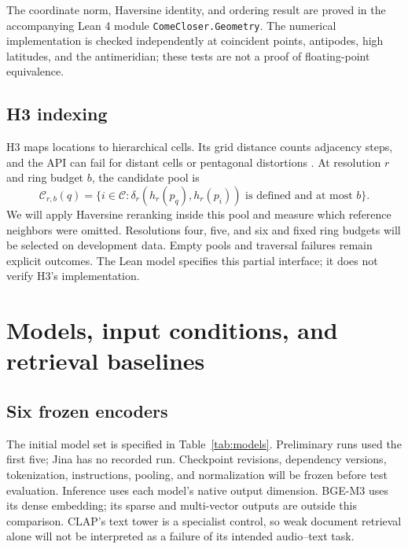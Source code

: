 \documentclass[10pt]{article}
\begin{document}
The coordinate norm, Haversine identity, and ordering result are proved in the accompanying Lean 4 module \texttt{ComeCloser.Geometry}. The numerical implementation is checked independently at coincident points, antipodes, high latitudes, and the antimeridian; these tests are not a proof of floating-point equivalence.

\subsection{H3 indexing}
H3 maps locations to hierarchical cells. Its grid distance counts adjacency steps, and the API can fail for distant cells or pentagonal distortions \citep{h3docs}. At resolution $r$ and ring budget $b$, the candidate pool is
\begin{equation}
\mathcal C_{r,b}(q)=\{i\in\mathcal C:
\delta_r(h_r(p_q),h_r(p_i))\text{ is defined and at most }b\}.
\label{eq:h3pool}
\end{equation}
We will apply Haversine reranking inside this pool and measure which reference neighbors were omitted. Resolutions four, five, and six and fixed ring budgets will be selected on development data. Empty pools and traversal failures remain explicit outcomes. The Lean model specifies this partial interface; it does not verify H3's implementation.

\section{Models, input conditions, and retrieval baselines}
\subsection{Six frozen encoders}
The initial model set is specified in Table~\ref{tab:models}. Preliminary runs used the first five; Jina has no recorded run. Checkpoint revisions, dependency versions, tokenization, instructions, pooling, and normalization will be frozen before test evaluation. Inference uses each model's native output dimension. BGE-M3 uses its dense embedding; its sparse and multi-vector outputs are outside this comparison. CLAP's text tower is a specialist control, so weak document retrieval alone will not be interpreted as a failure of its intended audio--text task.
\end{document}
